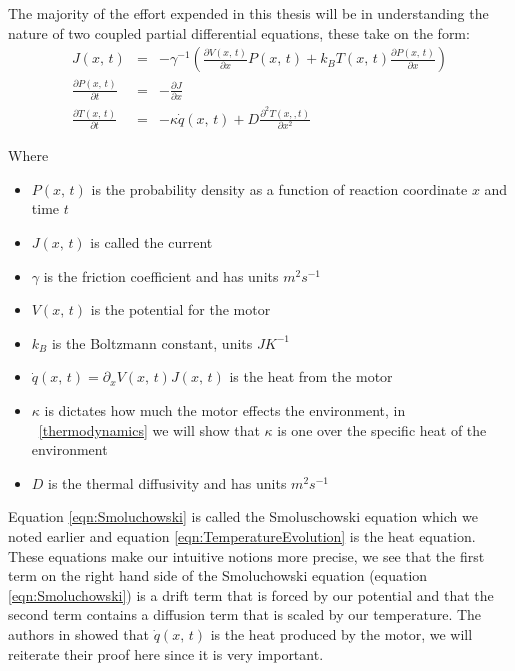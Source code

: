 
The majority of the effort expended in this thesis will be in understanding the nature of two coupled partial differential equations, these take on the form:
\begin{eqnarray}
J(x, \, t) &=& -\gamma^{-1} \left ( \frac{\partial V(x, \, t)}{\partial x} P(x, \, t) + k_B T(x, \, t) \frac{\partial P(x, \, t)}{\partial x} \right ) \label{eqn:current} \\
\frac{\partial P(x, \, t)}{\partial t} &=& -\frac{\partial J}{\partial x} \label{eqn:Smoluchowski} \\
\frac{\partial T(x, \, t)}{\partial t} &=& -\kappa \dot{q}(x, \, t) + D \frac{\partial^2 T(x, 
, t)}{\partial x^2} \label{eqn:TemperatureEvolution}
\end{eqnarray}

Where
\begin{itemize}
\item{$P(x, \, t)$ is the probability density as a function of  reaction coordinate $x$ and time $t$}
\item{$J(x, \, t)$ is called the current}
\item{$\gamma$ is the friction coefficient and has units $m^2 s^{-1}$}
\item{$V(x, \, t)$ is the potential for the motor}
\item{$k_B$ is the Boltzmann constant, units $J K^{-1}$}
\item{$\dot{q}(x, \, t) = \partial_x V(x, \, t) J(x, \, t)$ is the heat from the motor \cite{M.W.Jack2016}}
\item{$\kappa$ is dictates how much the motor effects the environment, in ~\autoref{thermodynamics} we will show that $\kappa$ is one over the specific heat of the environment}
\item{$D$ is the thermal diffusivity and has units $m^2 s^{-1}$}
\end{itemize}
Equation \ref{eqn:Smoluchowski} is called the Smoluschowski equation which we noted earlier and equation \ref{eqn:TemperatureEvolution} is the heat equation. These equations make our intuitive notions more precise, we see that the first term on the right hand side of the Smoluchowski equation (equation \ref{eqn:Smoluchowski}) is a drift term that is forced by our potential and that the second term contains a diffusion term that is scaled by our temperature. The authors in \cite{M.W.Jack2016} showed that $\dot{q}(x, \, t)$ is the heat produced by the motor, we will reiterate their proof here since it is very important. 

